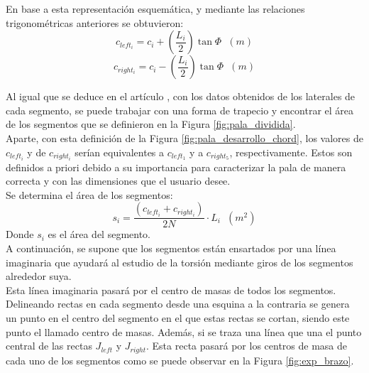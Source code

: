 En base a esta representación esquemática, y mediante las relaciones trigonométricas anteriores se obtuvieron:
\begin{equation}
 c_{left_i} = c_i + (\dfrac{L_i}{2}) \tan \varPhi \hspace{7pt} (m)
 \label{def:laterales_segmento_left}
\end{equation}
\begin{equation}
 c_{right_i} = c_i - (\dfrac{L_i}{2}) \tan \varPhi \hspace{7pt} (m)
\label{def:laterales_segmento_right}
\end{equation}

Al igual que se deduce en el artículo \cite{armenta2021predictive}, con los datos obtenidos de los laterales de cada segmento, se puede trabajar con una forma de trapecio y encontrar el área de los segmentos que se definieron en la Figura \ref{fig:pala_dividida}.\\

Aparte, con esta definición  de la Figura \ref{fig:pala_desarrollo_chord}, los valores de $c_{left_i}$ y de $c_{right_i}$ serían equivalentes a $c_{left_1}$ y a $c_{right_5}$, respectivamente. Estos son definidos a priori debido a su importancia para caracterizar la pala de manera correcta y con las dimensiones que el usuario desee.\\

Se determina el área de los segmentos:
\begin{equation}
 s_{i} = \dfrac{(c_{left_i} + c_{right_i})}{2N} \cdot L_i \hspace{7pt} (m^2)
\label{def:area_segmentos}
\end{equation}
Donde $s_i$ es el área del segmento.\\

A continuación, se supone que los segmentos están ensartados por una línea imaginaria que ayudará al estudio de la torsión mediante giros de los segmentos alrededor suya. \\

Esta línea imaginaria pasará por el centro de masas de todos los segmentos. Delineando rectas en cada segmento desde una esquina a la contraria se genera un punto en el centro del segmento en el que estas rectas se cortan, siendo este punto el llamado centro de masas. Además, si se traza una línea que una el punto central de las rectas $J_{left}$ y $J_{right}$. Esta recta pasará por los centros de masa de cada uno de los segmentos como se puede observar en la Figura \ref{fig:exp_brazo}.\\

